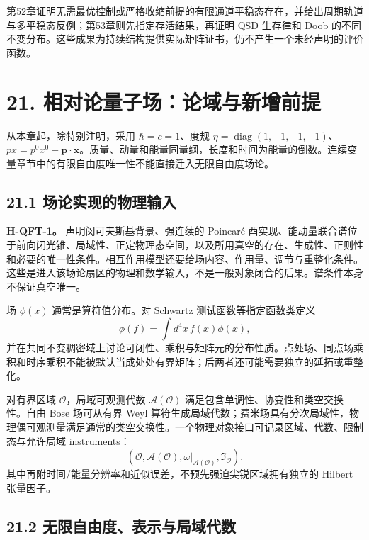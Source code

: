 \documentclass[
  11pt,
  oneside]{book}
\begin{document}
第52章证明无需最优控制或严格收缩前提的有限通道平稳态存在，并给出周期轨道与多平稳态反例；第53章则先指定存活结果，再证明
QSD 生存律和 Doob
的不同不变分布。这些成果为持续结构提供实际矩阵证书，仍不产生一个未经声明的评价函数。

\hypertarget{ch-21}{%
\chapter{21. 相对论量子场：论域与新增前提}\label{ch-21}}

从本章起，除特别注明，采用 \(\hbar=c=1\)、度规
\(\eta=\operatorname{diag}(1,-1,-1,-1)\)、\(p x=p^0x^0-\mathbf p\cdot\mathbf x\)。质量、动量和能量同量纲，长度和时间为能量的倒数。连续变量章节中的有限自由度唯一性不能直接迁入无限自由度场论。

\hypertarget{ux573aux8bbaux5b9eux73b0ux7684ux7269ux7406ux8f93ux5165}{%
\section{21.1
场论实现的物理输入}\label{ux573aux8bbaux5b9eux73b0ux7684ux7269ux7406ux8f93ux5165}}

\textbf{H-QFT-1。} 声明闵可夫斯基背景、强连续的 Poincaré
酉实现、能动量联合谱位于前向闭光锥、局域性、正定物理态空间，以及所用真空的存在、生成性、正则性和必要的唯一性条件。相互作用模型还要给场内容、作用量、调节与重整化条件。这些是进入该场论扇区的物理和数学输入，不是一般对象闭合的后果。谱条件本身不保证真空唯一。

场 \(\phi(x)\) 通常是算符值分布。对 Schwartz 测试函数等指定函数类定义 \[
\phi(f)=\int d^4x\,f(x)\phi(x),
\]
并在共同不变稠密域上讨论可闭性、乘积与矩阵元的分布性质。点处场、同点场乘积和时序乘积不能被默认当成处处有界矩阵；后两者还可能需要独立的延拓或重整化。

对有界区域 \(\mathcal O\)，局域可观测代数 \(\mathcal A(\mathcal O)\)
满足包含单调性、协变性和类空交换性。自由 Bose 场可从有界 Weyl
算符生成局域代数；费米场具有分次局域性，物理偶可观测量满足通常的类空交换性。一个物理对象接口可记录区域、代数、限制态与允许局域
instruments： \[
(\mathcal O,\mathcal A(\mathcal O),\omega|_{\mathcal A(\mathcal O)},\mathfrak I_{\mathcal O}).
\] 其中再附时间/能量分辨率和近似误差，不预先强迫尖锐区域拥有独立的
Hilbert 张量因子。

\hypertarget{ux65e0ux9650ux81eaux7531ux5ea6ux8868ux793aux4e0eux5c40ux57dfux4ee3ux6570}{%
\section{21.2
无限自由度、表示与局域代数}\label{ux65e0ux9650ux81eaux7531ux5ea6ux8868ux793aux4e0eux5c40ux57dfux4ee3ux6570}}
\end{document}
